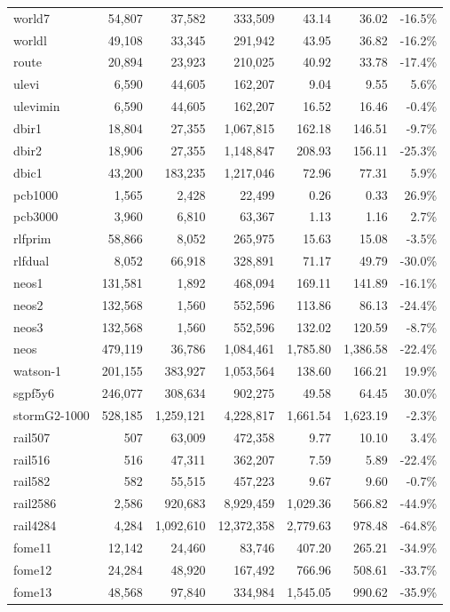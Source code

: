 \begin{small}
\begin{longtable}{|l|rrr|r|r|r|}
world7   &  54,807 &   37,582 &   333,509 &   43.14 &   36.02 & -16.5\% \\
worldl   &  49,108 &   33,345 &   291,942 &   43.95 &   36.82 & -16.2\% \\
route    &  20,894 &   23,923 &   210,025 &   40.92 &   33.78 & -17.4\% \\
ulevi    &   6,590 &   44,605 &   162,207 &    9.04 &    9.55 &   5.6\% \\
ulevimin &   6,590 &   44,605 &   162,207 &   16.52 &   16.46 &  -0.4\% \\
dbir1    &  18,804 &   27,355 & 1,067,815 &  162.18 &  146.51 &  -9.7\% \\
dbir2    &  18,906 &   27,355 & 1,148,847 &  208.93 &  156.11 & -25.3\% \\
dbic1    &  43,200 &  183,235 & 1,217,046 &   72.96 &   77.31 &   5.9\% \\
pcb1000  &   1,565 &    2,428 &    22,499 &    0.26 &    0.33 &  26.9\% \\
pcb3000  &   3,960 &    6,810 &    63,367 &    1.13 &    1.16 &   2.7\% \\
rlfprim  &  58,866 &    8,052 &   265,975 &   15.63 &   15.08 &  -3.5\% \\
rlfdual  &   8,052 &   66,918 &   328,891 &   71.17 &   49.79 & -30.0\% \\
neos1    & 131,581 &    1,892 &   468,094 &  169.11 &  141.89 & -16.1\% \\
neos2    & 132,568 &    1,560 &   552,596 &  113.86 &   86.13 & -24.4\% \\
neos3    & 132,568 &    1,560 &   552,596 &  132.02 &  120.59 &  -8.7\% \\
neos     & 479,119 &   36,786 & 1,084,461 &1,785.80 &1,386.58 & -22.4\% \\
watson-1 & 201,155 &  383,927 & 1,053,564 &  138.60 &  166.21 &  19.9\% \\
sgpf5y6  & 246,077 &  308,634 &   902,275 &   49.58 &   64.45 &  30.0\% \\
stormG2-1000 & 528,185 & 1,259,121 & 4,228,817 & 1,661.54 & 1,623.19 & -2.3\%\\
rail507  &     507 &   63,009 &   472,358 &    9.77 &   10.10 &   3.4\% \\
rail516  &     516 &   47,311 &   362,207 &    7.59 &    5.89 & -22.4\% \\
rail582  &     582 &   55,515 &   457,223 &    9.67 &    9.60 &  -0.7\% \\
rail2586 &   2,586 &  920,683 & 8,929,459 &1,029.36 &  566.82 & -44.9\% \\
rail4284 &   4,284 &1,092,610 &12,372,358 &2,779.63 &  978.48 & -64.8\% \\
fome11   &  12,142 &   24,460 &    83,746 &  407.20 &  265.21 & -34.9\% \\
fome12   &  24,284 &   48,920 &   167,492 &  766.96 &  508.61 & -33.7\% \\
fome13   &  48,568 &   97,840 &   334,984 & 1,545.05 & 990.62 & -35.9\% \\
\end{longtable} 
\end{small}


